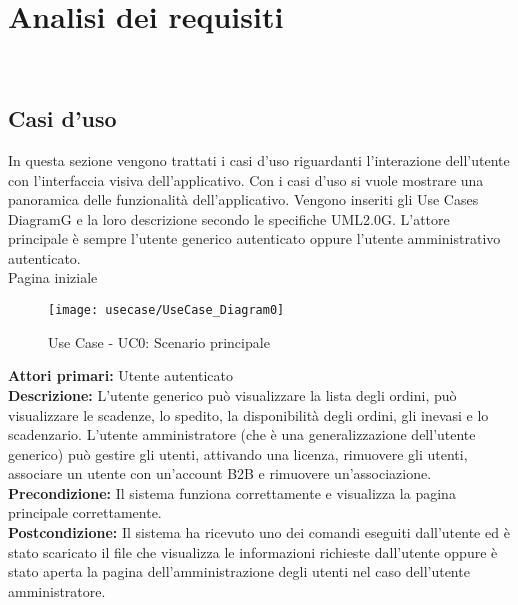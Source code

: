 
\chapter{Analisi dei requisiti}
\label{cap:analisi-requisiti}

\\


\section{Casi d'uso}

In questa sezione vengono trattati i casi d'uso riguardanti l'interazione dell'utente con l'interfaccia visiva dell'applicativo. Con i casi d'uso si vuole mostrare una panoramica delle funzionalità dell'applicativo. Vengono inseriti gli Use Cases DiagramG e la loro descrizione secondo le specifiche UML2.0G. L’attore principale è sempre l'utente generico autenticato oppure l'utente  amministrativo autenticato. \\
 Pagina iniziale 
\begin{figure}[!h] 
    \centering 
    \texttt{[image: usecase/UseCase\_Diagram0]} 
    \caption{Use Case - UC0: Scenario principale}
\end{figure} 
\textbf{Attori primari:}   Utente autenticato\\

\textbf{Descrizione:} L’utente generico può visualizzare la lista degli ordini, può visualizzare le scadenze, lo spedito, la disponibilità degli ordini, gli inevasi e lo scadenzario. L’utente amministratore (che è una generalizzazione dell’utente generico) può gestire gli utenti, attivando una licenza, rimuovere gli utenti, associare un utente con un’account B2B e rimuovere un’associazione. \\

\textbf{Precondizione:}  Il sistema funziona correttamente e visualizza la pagina principale correttamente. \\

\textbf{Postcondizione:} Il sistema ha ricevuto uno dei comandi eseguiti dall’utente ed è stato scaricato il file che visualizza le informazioni richieste dall’utente oppure è stato aperta la pagina dell’amministrazione degli utenti nel caso dell’utente amministratore.\\


